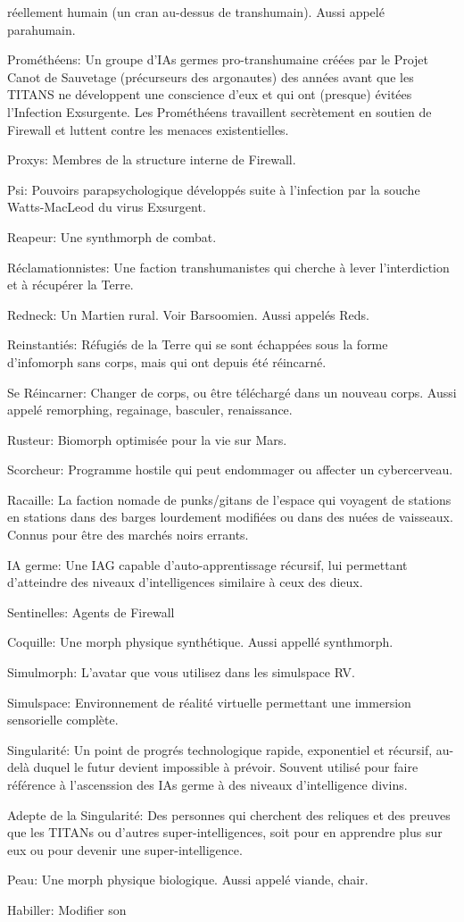 réellement humain (un cran au-dessus de transhumain). Aussi appelé parahumain. \item Prométhéens: Un groupe d'IAs germes pro-transhumaine créées par le Projet Canot de Sauvetage (précurseurs des argonautes) des années avant que les TITANS ne développent une conscience d'eux et qui ont (presque) évitées l'Infection Exsurgente. Les Prométhéens travaillent secrètement en soutien de Firewall et luttent contre les menaces existentielles. \item Proxys: Membres de la structure interne de Firewall. \item Psi: Pouvoirs parapsychologique développés suite à l'infection par la souche Watts-MacLeod du virus Exsurgent. \item Reapeur: Une synthmorph de combat. \item Réclamationnistes: Une faction transhumanistes qui cherche à lever l'interdiction et à récupérer la Terre. \item Redneck: Un Martien rural. Voir Barsoomien. Aussi appelés Reds. \item Reinstantiés: Réfugiés de la Terre qui se sont échappées sous la forme d'infomorph sans corps, mais qui ont depuis été réincarné. \item Se Réincarner: Changer de corps, ou être téléchargé dans un nouveau corps. Aussi appelé remorphing, regainage, basculer, renaissance. \item Rusteur: Biomorph optimisée pour la vie sur Mars. \item Scorcheur: Programme hostile qui peut endommager ou affecter un cybercerveau. \item Racaille: La faction nomade de punks/gitans de l'espace qui voyagent de stations en stations dans des barges lourdement modifiées ou dans des nuées de vaisseaux. Connus pour être des marchés noirs errants. \item IA germe: Une IAG capable d'auto-apprentissage récursif, lui permettant d'atteindre des niveaux d'intelligences similaire à ceux des dieux. \item Sentinelles: Agents de Firewall \item Coquille: Une morph physique synthétique. Aussi appellé synthmorph. \item Simulmorph: L'avatar que vous utilisez dans les simulspace RV. \item Simulspace: Environnement de réalité virtuelle permettant une immersion sensorielle complète. \item Singularité: Un point de progrés technologique rapide, exponentiel et récursif, au-delà duquel le futur devient impossible à prévoir. Souvent utilisé pour faire référence à l'ascenssion des IAs germe à des niveaux d'intelligence divins. \item Adepte de la Singularité: Des personnes qui cherchent des reliques et des preuves que les TITANs ou d'autres super-intelligences, soit pour en apprendre plus sur eux ou pour devenir une super-intelligence. \item Peau: Une morph physique biologique. Aussi appelé viande, chair. \item Habiller: Modifier son 